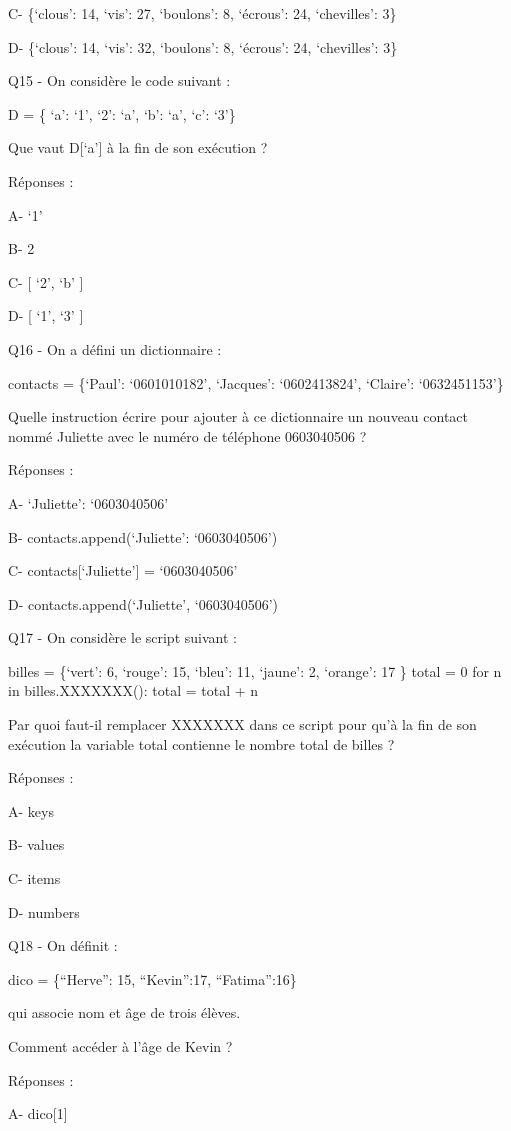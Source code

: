 \documentclass[
]{book}
\begin{document}
C- \{`clous': 14, `vis': 27, `boulons': 8, `écrous': 24, `chevilles': 3\}

D- \{`clous': 14, `vis': 32, `boulons': 8, `écrous': 24, `chevilles': 3\}

Q15 - On considère le code suivant :

D = \{ `a': `1', `2': `a', `b': `a', `c': `3'\}

Que vaut D{[}`a'{]} à la fin de son exécution ?

Réponses :

A- `1'

B- 2

C- {[} `2', `b' {]}

D- {[} `1', `3' {]}

Q16 - On a défini un dictionnaire :

contacts = \{`Paul': `0601010182', `Jacques': `0602413824', `Claire': `0632451153'\}

Quelle instruction écrire pour ajouter à ce dictionnaire un nouveau contact nommé Juliette avec le numéro de téléphone 0603040506 ?

Réponses :

A- `Juliette': `0603040506'

B- contacts.append(`Juliette': `0603040506')

C- contacts{[}`Juliette'{]} = `0603040506'

D- contacts.append(`Juliette', `0603040506')

Q17 - On considère le script suivant :

billes = \{`vert': 6, `rouge': 15, `bleu': 11, `jaune': 2, `orange': 17 \}
total = 0
for n in billes.XXXXXXX():
total = total + n

Par quoi faut-il remplacer XXXXXXX dans ce script pour qu'à la fin de son exécution la variable total contienne le nombre total de billes ?

Réponses :

A- keys

B- values

C- items

D- numbers

Q18 - On définit :

dico = \{``Herve'': 15, ``Kevin'':17, ``Fatima'':16\}

qui associe nom et âge de trois élèves.

Comment accéder à l'âge de Kevin ?

Réponses :

A- dico{[}1{]}
\end{document}
